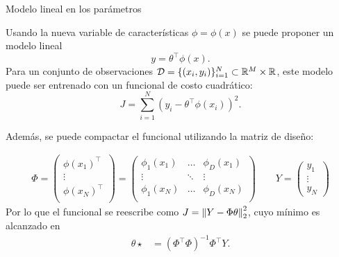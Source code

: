 \documentclass[9pt, handout]{beamer}
\begin{document}
\begin{frame}{Modelo lineal en los parámetros}

Usando la nueva variable de  características $\phi=\phi(x)$ se puede proponer un modelo lineal
\begin{equation*}
    y = \theta^\top\phi(x).
\end{equation*} \pause
Para un conjunto de observaciones ${\mathcal D} = \{(x_i,y_i)\}_{i=1}^N \subset\mathbb{R}^M\times\mathbb{R}$, este modelo puede ser entrenado con un funcional de costo cuadrático:
\begin{equation*}
	J = \sum_{i=1}^N(y_i - \theta^\top\phi(x_i))^2.
	\end{equation*} \pause

Además, se puede compactar el funcional utilizando la matriz de diseño:

\begin{align*}
    \Phi = 
    \left( \begin{matrix} \phi(x_1)^\top\\
    \vdots \\
    \phi(x_N)^\top\\
    \end{matrix} \right)
     = \left( \begin{matrix} \phi_1(x_1)& \ldots & \phi_D(x_1)\\
    \vdots & \ddots & \vdots \\
    \phi_1(x_N) & \ldots & \phi_D(x_N)\\
    \end{matrix} \right)
    \qquad
    Y = \left( \begin{matrix} y_1 \\ \vdots \\ y_N \end{matrix} \right)
\end{align*}\pause
Por lo que el funcional se reescribe como $J=\left\lVert Y-\Phi\theta\right\rVert_2^2$, cuyo mínimo es alcanzado en
\begin{align*}
    \theta{\star}&= (\Phi^\top\Phi)^{-1}\Phi^\top Y\label{eq:nolin_theta}.
\end{align*}

\end{frame}
\end{document}
